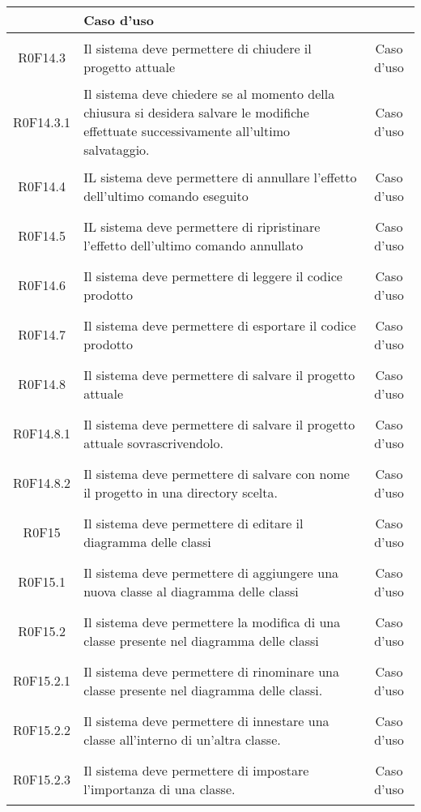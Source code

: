 \documentclass[../AnalisiDeiRequisiti.tex]{subfiles}
\begin{document}
\begin{longtable}{|c|>{\centering}p{7cm}|c|}
& Caso d'uso \\ \hline
\hypertarget{R0F14.3}{R0F14.3} & Il sistema deve permettere di chiudere il progetto attuale & Caso d'uso \\ \hline
\hypertarget{R0F14.3.1}{R0F14.3.1} & Il sistema deve chiedere se al momento della chiusura si desidera  salvare le modifiche effettuate successivamente all'ultimo salvataggio. & Caso d'uso \\ \hline
\hypertarget{R0F14.4}{R0F14.4} & IL sistema deve permettere di annullare l'effetto dell'ultimo comando eseguito & Caso d'uso \\ \hline
\hypertarget{R0F14.5}{R0F14.5} & IL sistema deve permettere di ripristinare l'effetto dell'ultimo comando annullato & Caso d'uso \\ \hline
\hypertarget{R0F14.6}{R0F14.6} & Il sistema deve permettere di leggere il codice prodotto & Caso d'uso \\ \hline
\hypertarget{R0F14.7}{R0F14.7} & Il sistema deve permettere di esportare il codice prodotto & Caso d'uso \\ \hline
\hypertarget{R0F14.8}{R0F14.8} & Il sistema deve permettere di salvare il progetto attuale & Caso d'uso \\ \hline
\hypertarget{R0F14.8.1}{R0F14.8.1} & Il sistema deve permettere di salvare il progetto attuale sovrascrivendolo. & Caso d'uso \\ \hline
\hypertarget{R0F14.8.2}{R0F14.8.2} & Il sistema deve permettere di salvare con nome il progetto in una directory scelta. & Caso d'uso \\ \hline
\hypertarget{R0F15}{R0F15} & Il sistema deve permettere di editare il diagramma delle classi & Caso d'uso \\ \hline
\hypertarget{R0F15.1}{R0F15.1} & Il sistema deve permettere di aggiungere una nuova classe al diagramma delle classi & Caso d'uso \\ \hline
\hypertarget{R0F15.2}{R0F15.2} & Il sistema deve permettere la modifica di una classe presente nel diagramma delle classi & Caso d'uso \\ \hline
\hypertarget{R0F15.2.1}{R0F15.2.1} & Il sistema deve permettere di rinominare una classe presente nel diagramma delle classi. & Caso d'uso \\ \hline
\hypertarget{R0F15.2.2}{R0F15.2.2} & Il sistema deve permettere di innestare una classe all'interno di un'altra classe. & Caso d'uso \\ \hline
\hypertarget{R0F15.2.3}{R0F15.2.3} & Il sistema deve permettere di impostare l'importanza di una classe. & Caso d'uso \\ \hline

\end{longtable}
\end{document}
